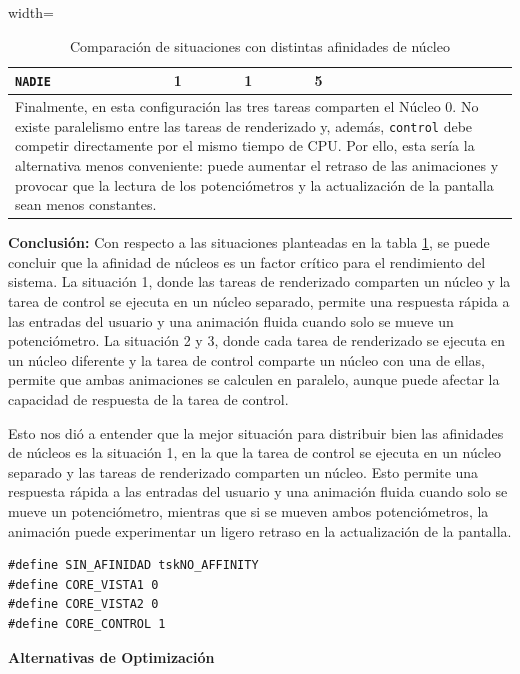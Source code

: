 \documentclass[12pt, letterpaper]{article}
\begin{document}
\begin{table}[H]
\begin{adjustbox}{width=\textwidth}
\begin{tabular}{|l|l|l|l|l|l|l|}
        \texttt{NADIE} & 1 & 1 & 5 &  &  &  \\
        \hline
        \multicolumn{7}{|p{\textwidth}|}{
            Finalmente, en esta configuración las tres tareas comparten el Núcleo 0. No existe paralelismo entre las tareas de renderizado y, además, \texttt{control} debe competir directamente por el mismo tiempo de CPU. Por ello, esta sería la alternativa menos conveniente: puede aumentar el retraso de las animaciones y provocar que la lectura de los potenciómetros y la actualización de la pantalla sean menos constantes.
        } \\
        \hline
    \end{tabular}
\end{adjustbox}
\caption{Comparación de situaciones con distintas afinidades de núcleo}
\label{tab:afinidad}
\end{table}

\textbf{Conclusión:} Con respecto a las situaciones planteadas en la tabla \ref{tab:afinidad}, se puede concluir que la afinidad de núcleos es un factor crítico para el rendimiento del sistema. La situación 1, donde las tareas de renderizado comparten un núcleo y la tarea de control se ejecuta en un núcleo separado, permite una respuesta rápida a las entradas del usuario y una animación fluida cuando solo se mueve un potenciómetro. La situación 2 y 3, donde cada tarea de renderizado se ejecuta en un núcleo diferente y la tarea de control comparte un núcleo con una de ellas, permite que ambas animaciones se calculen en paralelo, aunque puede afectar la capacidad de respuesta de la tarea de control.

Esto nos dió a entender que la mejor situación para distribuir bien las afinidades de núcleos es la situación 1, en la que la tarea de control se ejecuta en un núcleo separado y las tareas de renderizado comparten un núcleo. Esto permite una respuesta rápida a las entradas del usuario y una animación fluida cuando solo se mueve un potenciómetro, mientras que si se mueven ambos potenciómetros, la animación puede experimentar un ligero retraso en la actualización de la pantalla.

\begin{lstlisting}[style=cstyle, caption={Distribución de afinidades de núcleos en la situación 1}, label={lst:afinidad-situacion1}]
#define SIN_AFINIDAD tskNO_AFFINITY
#define CORE_VISTA1 0
#define CORE_VISTA2 0
#define CORE_CONTROL 1
\end{lstlisting}

\textbf{Alternativas de Optimización}
\end{document}
